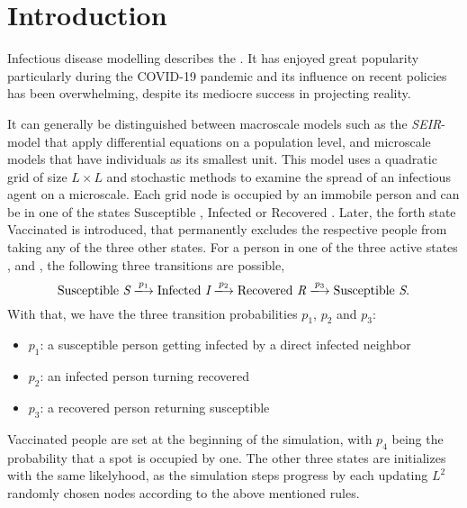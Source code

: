 \section{Introduction}


Infectious disease modelling describes the . 
It has enjoyed great popularity particularly during the COVID-19 pandemic and its influence on recent policies has been overwhelming, despite its mediocre success in projecting reality. 

It can generally be distinguished between macroscale models such as the \textit{SEIR}-model that apply differential equations on a population level, and microscale models that have individuals as its smallest unit.
This model uses a quadratic grid of size $L\times L$ and stochastic methods to examine the spread of an infectious agent on a microscale. Each grid node is occupied by an immobile person and can be in one of the states
Susceptible \susceptible{}, Infected \infected{} or Recovered \recovered{}. Later, the forth state Vaccinated \vaccinated{} is introduced, that permanently excludes the respective people from taking any of the three other states. 
For a person in one of the three active states \susceptible{}, \infected{} and \recovered{}, the following three transitions are possible,
\begin{equation*}
    \mathrm{Susceptible}~\susceptible\xlongrightarrow{p_1}\mathrm{Infected}~\infected{}\xlongrightarrow{p_2}\mathrm{Recovered}~\recovered{}\xlongrightarrow{p_3}\mathrm{Susceptible}~\susceptible{}.
\end{equation*}
With that, we have the three transition probabilities $p_1$, $p_2$ and $p_3$:
\begin{itemize}
    \item $p_1$: a susceptible person getting infected by a direct infected neighbor
    \item $p_2$: an infected person turning recovered
    \item $p_3$: a recovered person returning susceptible
\end{itemize}
Vaccinated people \vaccinated{} are set at the beginning of the simulation, with $p_4$ being the probability that a spot is occupied by one. The other three states are initializes with the same likelyhood, as the 
simulation steps progress by each updating $L^2$ randomly chosen nodes according to the above mentioned rules.

